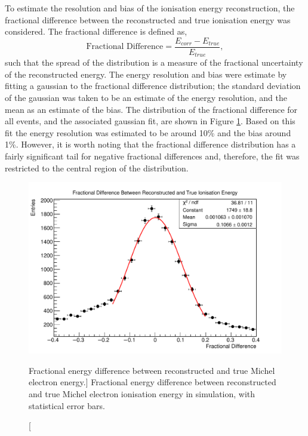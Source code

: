 To estimate the resolution and bias of the ionisation energy reconstruction, the
fractional difference between the reconstructed and true ionisation energy was
considered. The fractional difference is defined as,
\begin{equation*}
	\mbox{Fractional Difference} = \frac{E_{corr} - E_{true}}{E_{true}},
\end{equation*}
such that the spread of the distribution is a measure of the fractional
uncertainty of the reconstructed energy. The energy resolution and bias were
estimate by fitting a gaussian to the fractional difference distribution; the
standard deviation of the gaussian was taken to be an estimate of the energy
resolution, and the mean as an estimate of the bias. The distribution of the 
fractional difference for all events, and the associated gaussian fit, are 
shown in Figure \ref{fig:frac_diff_ion}. Based on this fit the energy 
resolution was estimated to be around 10\% and the bias around 1\%. However, 
it is worth noting that the fractional difference distribution has a fairly 
significant tail for negative fractional differences and, therefore, the fit 
was restricted to the central region of the distribution.
\begin{figure}
	\centering
	\includegraphics[width=\textwidth]{figures/frac_diff_ion.pdf}
	\caption
	[Fractional energy difference between reconstructed and true Michel electron
	energy.]
	{Fractional energy difference between reconstructed and true Michel electron
	ionisation energy in \protodune{} simulation, with statistical error bars.}
	\label{fig:frac_diff_ion}
\end{figure}


